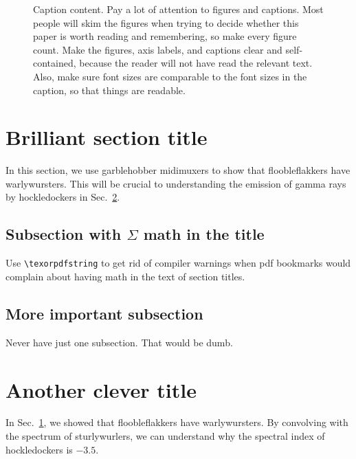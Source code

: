 \documentclass[reprint, aps, prd, letterpaper, noshowpacs, amsmath, %
amssymb, amsfonts, nofootinbib, floatfix, superscriptaddress, %
twoside]{revtex4-1}
\begin{document}
\begin{figure}
  \caption{ \label{fig:SomeFigure} %
     Caption content. Pay a lot of attention to
    figures and captions.  Most people will skim the figures when
    trying to decide whether this paper is worth reading and
    remembering, so make every figure count.  Make the figures, axis
    labels, and captions clear and self-contained, because the reader
    will not have read the relevant text.  Also, make sure font sizes
    are comparable to the font sizes in the caption, so that things
    are readable. %
  }
\end{figure}


\section{Brilliant section title}
\label{sec:BrilliantSection}
In this section, we use garblehobber midimuxers to show that
floobleflakkers have warlywursters.  This will be crucial to
understanding the emission of gamma rays by hockledockers in
Sec.~\ref{sec:AnotherCleverOne}.

\subsection{Subsection with \texorpdfstring{$\Sigma$}{Sigma}
  math in the title}
\label{sec:ImportantSubsection}

Use \verb|\texorpdfstring| to get rid of compiler warnings when pdf
bookmarks would complain about having math in the text of section
titles.

\subsection{More important subsection}
\label{sec:MoreImportantSubsection}
Never have just one subsection.  That would be dumb.


\section{Another clever title}
\label{sec:AnotherCleverOne}
In Sec.~\ref{sec:BrilliantSection}, we showed that floobleflakkers
have warlywursters.  By convolving with the spectrum of sturlywurlers,
we can understand why the spectral index of hockledockers is $-3.5$.
\end{document}
